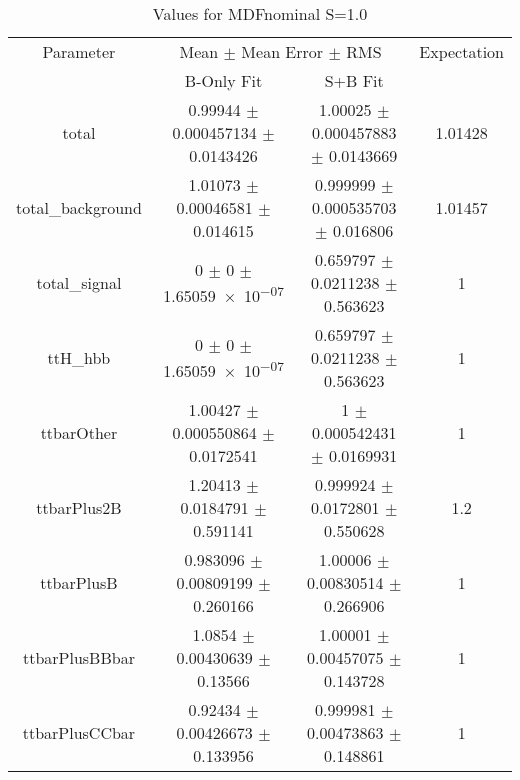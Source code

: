 \begin{table}
\centering
\caption{Values for MDFnominal S=1.0}
\begin{tabular}{cccc}
\toprule
Parameter & \multicolumn{2}{c}{Mean $\pm$ Mean Error $\pm$ RMS} & Expectation\\
 & B-Only Fit & S+B Fit & \\
\midrule
total & \num{0.99944} $\pm$ \num{0.000457134} $\pm$ \num{0.0143426} & \num{1.00025} $\pm$ \num{0.000457883} $\pm$ \num{0.0143669} & \num{1.01428}\\
total\_background & \num{1.01073} $\pm$ \num{0.00046581} $\pm$ \num{0.014615} & \num{0.999999} $\pm$ \num{0.000535703} $\pm$ \num{0.016806} & \num{1.01457}\\
total\_signal & \num{0} $\pm$ \num{0} $\pm$ \num{1.65059e-07} & \num{0.659797} $\pm$ \num{0.0211238} $\pm$ \num{0.563623} & \num{1}\\
ttH\_hbb & \num{0} $\pm$ \num{0} $\pm$ \num{1.65059e-07} & \num{0.659797} $\pm$ \num{0.0211238} $\pm$ \num{0.563623} & \num{1}\\
ttbarOther & \num{1.00427} $\pm$ \num{0.000550864} $\pm$ \num{0.0172541} & \num{1} $\pm$ \num{0.000542431} $\pm$ \num{0.0169931} & \num{1}\\
ttbarPlus2B & \num{1.20413} $\pm$ \num{0.0184791} $\pm$ \num{0.591141} & \num{0.999924} $\pm$ \num{0.0172801} $\pm$ \num{0.550628} & \num{1.2}\\
ttbarPlusB & \num{0.983096} $\pm$ \num{0.00809199} $\pm$ \num{0.260166} & \num{1.00006} $\pm$ \num{0.00830514} $\pm$ \num{0.266906} & \num{1}\\
ttbarPlusBBbar & \num{1.0854} $\pm$ \num{0.00430639} $\pm$ \num{0.13566} & \num{1.00001} $\pm$ \num{0.00457075} $\pm$ \num{0.143728} & \num{1}\\
ttbarPlusCCbar & \num{0.92434} $\pm$ \num{0.00426673} $\pm$ \num{0.133956} & \num{0.999981} $\pm$ \num{0.00473863} $\pm$ \num{0.148861} & \num{1}\\
\bottomrule
\end{tabular}
\end{table}